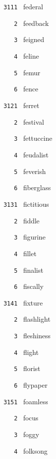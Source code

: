 \documentclass[11pt]{article}
\begin{document}
\begin{multicols}{6}
\small
\noindent \texttt{ 3111 } federal  \par
\noindent \texttt{ \ \ \ 2 } feedback  \par
\noindent \texttt{ \ \ \ 3 } feigned  \par
\noindent \texttt{ \ \ \ 4 } feline  \par
\noindent \texttt{ \ \ \ 5 } femur  \par
\noindent \texttt{ \ \ \ 6 } fence  \par
\vspace{3mm}
\noindent \texttt{ 3121 } ferret  \par
\noindent \texttt{ \ \ \ 2 } festival  \par
\noindent \texttt{ \ \ \ 3 } fettuccine  \par
\noindent \texttt{ \ \ \ 4 } feudalist  \par
\noindent \texttt{ \ \ \ 5 } feverish  \par
\noindent \texttt{ \ \ \ 6 } fiberglass  \par
\vspace{3mm}
\noindent \texttt{ 3131 } fictitious  \par
\noindent \texttt{ \ \ \ 2 } fiddle  \par
\noindent \texttt{ \ \ \ 3 } figurine  \par
\noindent \texttt{ \ \ \ 4 } fillet  \par
\noindent \texttt{ \ \ \ 5 } finalist  \par
\noindent \texttt{ \ \ \ 6 } fiscally  \par
\vspace{3mm}
\noindent \texttt{ 3141 } fixture  \par
\noindent \texttt{ \ \ \ 2 } flashlight  \par
\noindent \texttt{ \ \ \ 3 } fleshiness  \par
\noindent \texttt{ \ \ \ 4 } flight  \par
\noindent \texttt{ \ \ \ 5 } florist  \par
\noindent \texttt{ \ \ \ 6 } flypaper  \par
\vspace{3mm}
\noindent \texttt{ 3151 } foamless  \par
\noindent \texttt{ \ \ \ 2 } focus  \par
\noindent \texttt{ \ \ \ 3 } foggy  \par
\noindent \texttt{ \ \ \ 4 } folksong  \par

\end{multicols}
\end{document}
